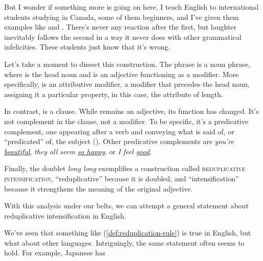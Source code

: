 But I wonder if something more is going on here. I teach English to international students studying in Canada, some of them beginners, and I've given them examples like  and . There's never any reaction after the first, but laughter inevitably follows the second in a way it never does with other grammatical infelicities. These students just know that it's wrong.

\begin{tcolorbox}[title=Breaking it down, colback=white, parbox] \label{sec:long-long}
\setlength{\parindent}{1.5em}

Let's take a moment to dissect this construction. The phrase  is a noun phrase, where  is the head noun and  is an adjective functioning as a modifier. More specifically,  is an attributive modifier, a modifier that precedes the head noun, assigning it a particular property, in this case, the attribute of length.

In contrast,  is a clause. While  remains an adjective, its function has changed. It's not complement in the clause, not a modifier. To be specific, it's a predicative complement, one appearing after a verb and conveying what is said of, or ``predicated'' of, the subject (). Other predicative complements are \textit{you're \uline{beautiful}}, \textit{they all seem \uline{so happy}}, or \textit{I feel \uline{good}}.

Finally, the doublet \textit{long long} exemplifies a construction called \textsc{reduplicative intensification}, ``reduplicative'' because it is doubled, and ``intensification'' because it strengthens the meaning of the original adjective.

\end{tcolorbox}

With this analysis under our belts, we can attempt a general statement about reduplicative intensification in English.%

\label{def:reduplication-rule}
\z

We've seen that something like (\ref{def:reduplication-rule}) is true in English, but what about other languages. Intriguingly, the same statement often seems to hold. For example, Japanese has

